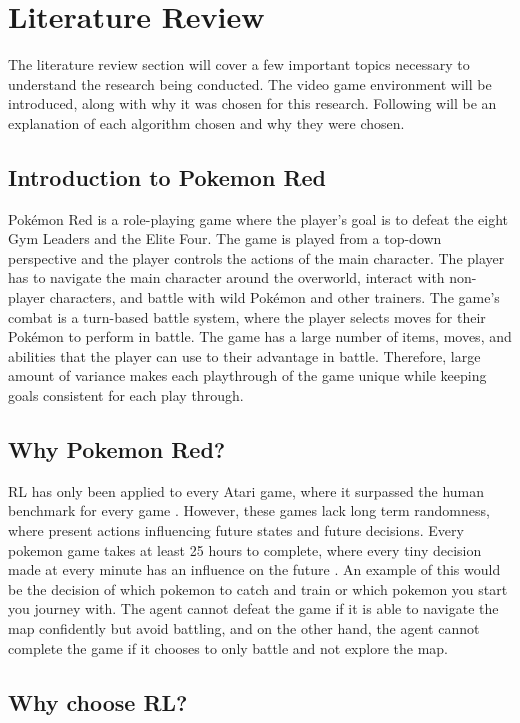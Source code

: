\section{Literature Review}

The literature review section will cover a few important topics necessary to understand the research being conducted. The video game environment will be introduced, along with why it was chosen for this research. Following will be an explanation of each algorithm chosen and why they were chosen.

\subsection{Introduction to Pokemon Red}

Pokémon Red is a role-playing game where the player's goal is to defeat the eight Gym Leaders and the Elite Four. The game is played from a top-down perspective and the player controls the actions of the main character. The player has to navigate the main character around the overworld, interact with non-player characters, and battle with wild Pokémon and other trainers. The game's combat is a turn-based battle system, where the player selects moves for their Pokémon to perform in battle. The game has a large number of items, moves, and abilities that the player can use to their advantage in battle. Therefore, large amount of variance makes each playthrough of the game unique while keeping goals consistent for each play through.

\subsection{Why Pokemon Red?}

RL has only been applied to every Atari game, where it surpassed the human benchmark for every game \cite{brockman2016openai}. However, these games lack long term randomness, where present actions influencing future states and future decisions. Every pokemon game takes at least 25 hours to complete, where every tiny decision made at every minute has an influence on the future \cite{howlongtobeat}. An example of this would be the decision of which pokemon to catch and train or which pokemon you start you journey with. The agent cannot defeat the game if it is able to navigate the map confidently but avoid battling, and on the other hand, the agent cannot complete the game if it chooses to only battle and not explore the map.

\subsection{Why choose RL?}

